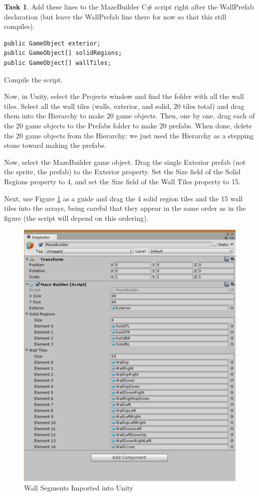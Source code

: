 \documentclass[12pt]{amsbook}
\theoremstyle{definition}
\newtheorem{task}[exercise]{Task}
\theoremstyle{remark}
\numberwithin{figure}{chapter}
\numberwithin{table}{chapter}
\numberwithin{section}{chapter}
\numberwithin{equation}{section}
\newcommand{\csharp}{\ensuremath{\mbox{C}\#}\xspace}
\begin{document}
\begin{task}
Add these lines to the MazeBuilder \csharp script right after the WallPrefab declaration (but leave the WallPrefab line there for now so that this still compiles).
\begin{verbatim}
public GameObject exterior;
public GameObject[] solidRegions;
public GameObject[] wallTiles;
\end{verbatim}
Compile the script. 
\end{task}

Now, in Unity, select the Projects window and find the folder with all the wall tiles.  Select all the wall tiles (walls, exterior, and solid, 20 tiles total) and drag them into the Hierarchy to make 20 game objects.  Then, one by one, drag each of the 20 game objects to the Prefabs folder to make 20 prefabs.  When done, delete the 20 game objects from the Hierarchy: we just used the Hierarchy as a stepping stone toward making the prefabs.

Now, select the MazeBuilder game object.  Drag the single Exterior prefab (not the sprite, the prefab) to the Exterior property.  Set the Size field of the Solid Regions property to 4, and set the Size field of the Wall Tiles property to 15.  

Next, use Figure \ref{fig:maze-builder-settings} as a guide and drag the 4 solid region tiles and the 15 wall tiles into the arrays, being careful that they appear in the same order as in the figure (the script will depend on this ordering).  

\begin{figure}[h]
  \includegraphics[width=6in]{MazeBuilderSettings.png}
  \caption{Wall Segments Imported into Unity}
  \label{fig:maze-builder-settings}
\end{figure}
\end{document}
